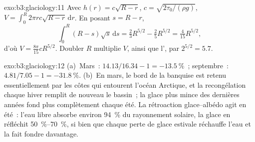 \begin{solution}{exo:b3:glaciology:11}
Avec $h(r) = c\sqrt{R - r}$, $c = \sqrt{2\tau_0/(\rho g)}$, $V =
\int_0^R2\pi rc\sqrt{R - r}\,\mathrm dr$. En posant $s = R - r$,
\[
\int_0^R(R - s)\sqrt s\,\mathrm ds = \tfrac23R^{5/2} - \tfrac25R^{5/2} =
\tfrac4{15}R^{5/2},
\]
d'où $V = \frac{8\pi}{15}cR^{5/2}$. Doubler $R$
multiplie $V$, ainsi que l', par $2^{5/2} = 5.7$.
\end{solution}

\begin{solution}{exo:b3:glaciology:12}
(a)~Mars~: $14.13/16.34 - 1 = \qty{-13.5}{\percent}$~; septembre~: $4.81/7.05
- 1 = \qty{-31.8}{\percent}$. (b)~En mars, le bord de la banquise est retenu essentiellement par
les côtes qui entourent l'océan Arctique, et la recongélation chaque hiver
remplit de nouveau le bassin~; la glace plus mince des dernières années fond plus
complètement chaque été. La rétroaction glace--albédo agit en été~: l'eau libre
absorbe environ \qty{94}{\percent} du rayonnement solaire, la glace en réfléchit
\qtyrange{50}{70}{\percent}, si bien que chaque perte de glace estivale réchauffe l'eau et
la fait fondre davantage.
\end{solution}

